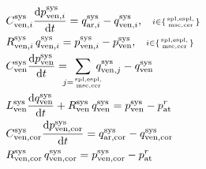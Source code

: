 \documentclass[a4paper,12pt]{report}
\begin{document}
\begin{align}
&C_{\mathrm{ven},i}^{\mathrm{sys}} \frac{\mathrm{d}p_{\mathrm{ven},i}^{\mathrm{sys}}}{\mathrm{d}t} = q_{\mathrm{ar},i}^{\mathrm{sys}} - q_{\mathrm{ven},i}^{\mathrm{sys}}, \quad\scriptstyle{i\in\{\mathrm{spl,espl,\atop msc,cer}\}}\nonumber\\
&R_{\mathrm{ven},i}^{\mathrm{sys}}\,q_{\mathrm{ven},i}^{\mathrm{sys}} = p_{\mathrm{ven},i}^{\mathrm{sys}}-p_{\mathrm{ven}}^{\mathrm{sys}}, \quad\scriptstyle{i\in\{\mathrm{spl,espl,\atop msc,cer}\}}\nonumber\\
&C_{\mathrm{ven}}^{\mathrm{sys}} \frac{\mathrm{d}p_{\mathrm{ven}}^{\mathrm{sys}}}{\mathrm{d}t} = \!\!\!\!\sum_{j=\mathrm{spl,espl,\atop msc,cer}}\!\!\!\!\!q_{\mathrm{ven},j}^{\mathrm{sys}}-q_{\mathrm{ven}}^{\mathrm{sys}}\nonumber\\
&L_{\mathrm{ven}}^{\mathrm{sys}}\frac{\mathrm{d}q_{\mathrm{ven}}^{\mathrm{sys}}}{\mathrm{d}t} + R_{\mathrm{ven}}^{\mathrm{sys}}\, q_{\mathrm{ven}}^{\mathrm{sys}} = p_{\mathrm{ven}}^{\mathrm{sys}} - p_{\mathrm{at}}^{r}\nonumber\\
&C_{\mathrm{ven,cor}}^{\mathrm{sys}} \frac{\mathrm{d}p_{\mathrm{ven,cor}}^{\mathrm{sys}}}{\mathrm{d}t} = q_{\mathrm{ar,cor}}^{\mathrm{sys}}-q_{\mathrm{ven,cor}}^{\mathrm{sys}}\nonumber\\
&R_{\mathrm{ven,cor}}^{\mathrm{sys}}\,q_{\mathrm{ven,cor}}^{\mathrm{sys}} = p_{\mathrm{ven,cor}}^{\mathrm{sys}} - p_{\mathrm{at}}^{r}\nonumber
\end{align}
\end{document}
